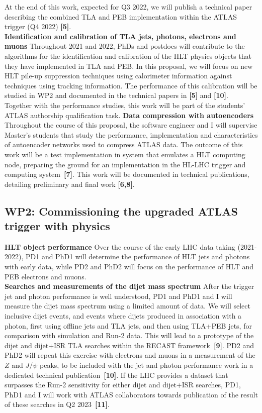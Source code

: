 At the end of this work, expected for Q3 2022, we will publish a technical paper describing the combined TLA and PEB implementation within the ATLAS trigger (Q4 2022) \textbf{[5]}. \\
\textbf{Identification and calibration of TLA jets, photons, electrons and muons} Throughout 2021 and 2022, PhDs and postdocs will contribute to the algorithms for the identification and calibration of the HLT physics objects that they have implemented in TLA and PEB. 
In this proposal, we will focus on new HLT pile-up suppression techniques using calorimeter information against techniques using tracking information. 
The performance of this calibration will be studied in WP2 and documented in the technical papers in \textbf{[5]} and \textbf{[10]}.\\
Together with the performance studies, this work will be part of the students' ATLAS authorship qualification task.
\textbf{Data compression with autoencoders} Throughout the course of this proposal, the software engineer and I will supervise Master's students that study the performance, implementation and characteristics of autoencoder networks used to compress ATLAS data. 
The outcome of this work will be a test implementation in system that emulates a HLT computing node, preparing the ground for an implementation in the HL-LHC trigger and computing system~\textbf{[7]}. 
This work will be documented in technical publications, detailing preliminary and final work \textbf{[6,8]}.

\subsection{WP2: Commissioning the upgraded ATLAS trigger with physics}

\textbf{HLT object performance} Over the course of the early LHC data taking (2021-2022), 
PD1 and PhD1 will determine the performance of HLT jets and photons with early data, while PD2 and PhD2 will focus on the performance of HLT and PEB electrons and muons. \\
\textbf{Searches and measurements of the dijet mass spectrum} After the trigger jet and photon performance is well understood, PD1 and PhD1 and I will measure the dijet mass spectrum using a limited amount of data. 
We will select inclusive dijet events, and events where dijets produced in association with a photon, first using offline jets and TLA jets, and then using TLA+PEB jets, for comparison with simulation and Run-2 data. 
This will lead to a prototype of the dijet and dijet+ISR TLA searches within the RECAST framework~\textbf{[9]}.   
PD2 and PhD2 will repeat this exercise with electrons and muons in a measurement of the $Z$ and $J/\psi$ peaks, 
to be included with the jet and photon performance work in a dedicated technical publication~\textbf{[10]}. 
If the LHC provides a dataset that surpasses the Run-2 sensitivity for either dijet and dijet+ISR searches, 
PD1, PhD1 and I will work with ATLAS collaborators towards publication of the result of these searches in Q2 2023~\textbf{[11]}.

